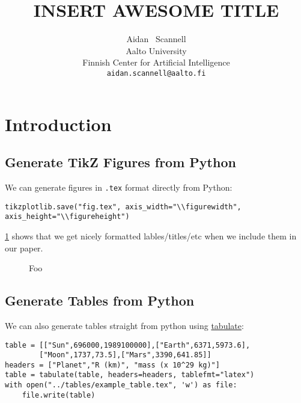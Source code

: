 \documentclass{article}
\title{INSERT AWESOME TITLE}
\author{%
  Aidan ~Scannell \\
  Aalto University\\
  Finnish Center for Artificial Intelligence \\
  \texttt{aidan.scannell@aalto.fi} \\
}
\newlength{\figurewidth}
\newlength{\figureheight}
\begin{document}
\maketitle

\section{Introduction} \label{sec:intro}

\subsection{Generate TikZ Figures from Python}
We can generate figures in \texttt{.tex} format directly from Python:
\begin{verbatim}
tikzplotlib.save("fig.tex", axis_width="\\figurewidth", axis_height="\\figureheight")
\end{verbatim}
\cref{fig:example} shows that we get nicely formatted lables/titles/etc when we include them in our paper.
\begin{figure}[h]
    \centering\footnotesize

    \setlength{\figurewidth}{.33\textwidth}
    \setlength{\figureheight}{.75\figurewidth}


    \begin{subfigure}{.4\textwidth}
        \centering
        
    \end{subfigure}
    \hfill
    \begin{subfigure}{.4\textwidth}
        \centering
        
    \end{subfigure}
    \caption{Foo}
    \label{fig:example}
\end{figure}

\subsection{Generate Tables from Python}
We can also generate tables straight from python using \href{https://github.com/astanin/python-tabulate}{tabulate}:
\begin{verbatim}
table = [["Sun",696000,1989100000],["Earth",6371,5973.6],
        ["Moon",1737,73.5],["Mars",3390,641.85]]
headers = ["Planet","R (km)", "mass (x 10^29 kg)"]
table = tabulate(table, headers=headers, tablefmt="latex")
with open("../tables/example_table.tex", 'w') as file:
    file.write(table)
\end{verbatim}
\end{document}
